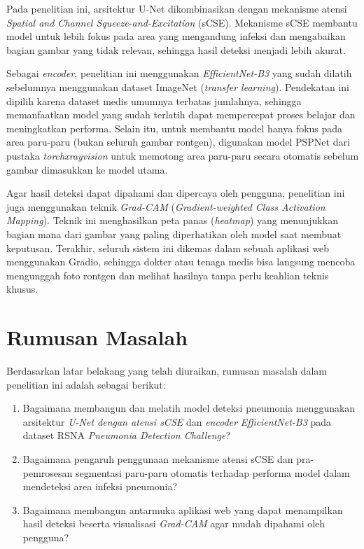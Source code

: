 \documentclass[12pt,a4paper,oneside]{book}
\begin{document}
Pada penelitian ini, arsitektur U-Net dikombinasikan dengan mekanisme atensi \textit{Spatial and Channel Squeeze-and-Excitation} (sCSE). Mekanisme sCSE membantu model untuk lebih fokus pada area yang mengandung infeksi dan mengabaikan bagian gambar yang tidak relevan, sehingga hasil deteksi menjadi lebih akurat.

Sebagai \textit{encoder}, penelitian ini menggunakan \textit{EfficientNet-B3} yang sudah dilatih sebelumnya menggunakan dataset ImageNet (\textit{transfer learning}). Pendekatan ini dipilih karena dataset medis umumnya terbatas jumlahnya, sehingga memanfaatkan model yang sudah terlatih dapat mempercepat proses belajar dan meningkatkan performa. Selain itu, untuk membantu model hanya fokus pada area paru-paru (bukan seluruh gambar rontgen), digunakan model PSPNet dari pustaka \textit{torchxrayvision} untuk memotong area paru-paru secara otomatis sebelum gambar dimasukkan ke model utama.

Agar hasil deteksi dapat dipahami dan dipercaya oleh pengguna, penelitian ini juga menggunakan teknik \textit{Grad-CAM} (\textit{Gradient-weighted Class Activation Mapping}). Teknik ini menghasilkan peta panas (\textit{heatmap}) yang menunjukkan bagian mana dari gambar yang paling diperhatikan oleh model saat membuat keputusan. Terakhir, seluruh sistem ini dikemas dalam sebuah aplikasi web menggunakan Gradio, sehingga dokter atau tenaga medis bisa langsung mencoba mengunggah foto rontgen dan melihat hasilnya tanpa perlu keahlian teknis khusus.

\section{Rumusan Masalah}

Berdasarkan latar belakang yang telah diuraikan, rumusan masalah dalam penelitian ini adalah sebagai berikut:

\begin{enumerate}
  \item Bagaimana membangun dan melatih model deteksi pneumonia menggunakan arsitektur \textit{U-Net dengan atensi sCSE} dan \textit{encoder} \textit{EfficientNet-B3} pada dataset RSNA \textit{Pneumonia Detection Challenge}?
  \item Bagaimana pengaruh penggunaan mekanisme atensi sCSE dan pra-pemrosesan segmentasi paru-paru otomatis terhadap performa model dalam mendeteksi area infeksi pneumonia?
  \item Bagaimana membangun antarmuka aplikasi web yang dapat menampilkan hasil deteksi beserta visualisasi \textit{Grad-CAM} agar mudah dipahami oleh pengguna?
\end{enumerate}
\end{document}
